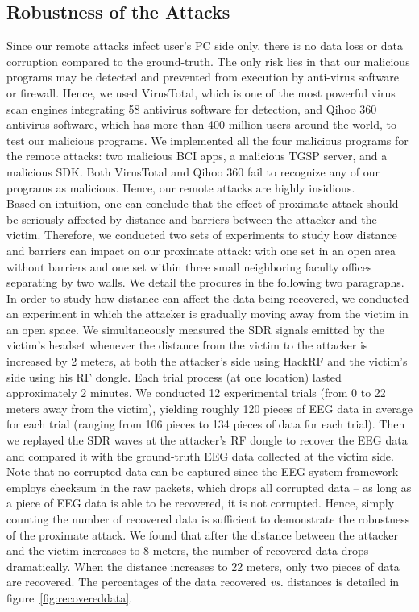 \subsection{Robustness of the Attacks}
Since our remote attacks infect user's PC side only, there is no data loss or data corruption compared to the ground-truth. The only risk lies in that our malicious programs may be detected and prevented from execution by anti-virus software or firewall. Hence, we used VirusTotal, which is one of the most powerful virus scan engines integrating 58 antivirus software for detection, and Qihoo 360 antivirus software, which has more than 400 million users around the world, to test our malicious programs. We implemented all the four malicious programs for the remote attacks: two malicious BCI apps, a malicious TGSP server, and a malicious SDK. Both VirusTotal and Qihoo 360 fail to recognize any of our programs as malicious. Hence, our remote attacks are highly insidious.\\
%
\indent Based on intuition, one can conclude that the effect of proximate attack should be seriously affected by distance and barriers between the attacker and the victim. Therefore, we conducted two sets of experiments to study how distance and barriers can impact on our proximate attack: with one set in an open area without barriers and one set within three small neighboring faculty offices separating by two walls. We detail the procures in the following two paragraphs.\\
%
\indent
In order to study how distance can affect the data being recovered, we conducted an experiment in which the attacker is gradually moving away from the victim in an open space. We simultaneously measured the SDR signals emitted by the victim's headset whenever the distance from the victim to the attacker is increased by 2 meters, at both the attacker's side using HackRF and the victim's side using his RF dongle. Each trial process (at one location) lasted approximately 2 minutes. We conducted 12 experimental trials (from 0 to 22 meters away from the victim), yielding roughly 120 pieces of EEG data in average for each trial (ranging from 106 pieces to 134 pieces of data for each trial). Then we replayed the SDR waves at the attacker's RF dongle to recover the EEG data and compared it with the ground-truth EEG data collected at the victim side. Note that no corrupted data can be captured since the EEG system framework employs checksum in the raw packets, which drops all corrupted data -- as long as a piece of EEG data is able to be recovered, it is not corrupted. Hence, simply counting the number of recovered data is sufficient to demonstrate the robustness of the proximate attack. We found that after the distance between the attacker and the victim increases to 8 meters, the number of recovered data drops dramatically. When the distance increases to 22 meters, only two pieces of data are recovered. The percentages of the data recovered \emph{vs.} distances is detailed in figure~\ref{fig:recovereddata}. \\
